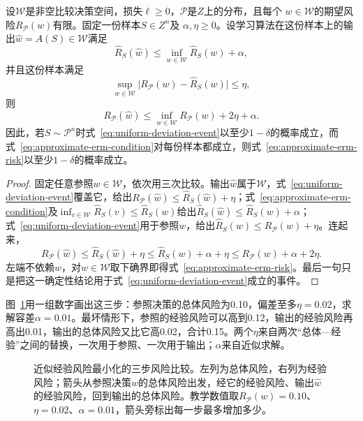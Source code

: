 \begin{theorem}[近似经验风险最小化的风险比较]
\label{thm:approximate-erm-risk}
设$\mathcal W$是非空比较决策空间，损失$\ell\geq0$，$\mathcal P$是$Z$上的分布，且每个
$w\in\mathcal W$的期望风险$R_{\mathcal P}(w)$有限。固定一份样本$S\in Z^n$及
$\alpha,\eta\geq0$。设学习算法在这份样本上的输出$\hat w=A(S)\in\mathcal W$满足
\begin{equation}
 \hat R_S(\hat w)\leq\inf_{w\in\mathcal W}\hat R_S(w)+\alpha,
 \label{eq:approximate-erm-condition}
\end{equation}
并且这份样本满足
\begin{equation}
 \sup_{w\in\mathcal W}\bigl|R_{\mathcal P}(w)-\hat R_S(w)\bigr|\leq\eta,
 \label{eq:uniform-deviation-event}
\end{equation}
则
\begin{equation}
 R_{\mathcal P}(\hat w)
 \leq\inf_{w\in\mathcal W}R_{\mathcal P}(w)+2\eta+\alpha.
 \label{eq:approximate-erm-risk}
\end{equation}
因此，若$S\sim\mathcal P^n$时式~\eqref{eq:uniform-deviation-event}以至少$1-\delta$的概率成立，而式~\eqref{eq:approximate-erm-condition}对每份样本都成立，则式~\eqref{eq:approximate-erm-risk}以至少$1-\delta$的概率成立。
\end{theorem}

\begin{proof}
固定任意参照$w\in\mathcal W$，依次用三次比较。输出$\hat w$属于$\mathcal W$，式~\eqref{eq:uniform-deviation-event}覆盖它，给出$R_{\mathcal P}(\hat w)\leq\hat R_S(\hat w)+\eta$；式~\eqref{eq:approximate-erm-condition}及$\inf_{v\in\mathcal W}\hat R_S(v)\leq\hat R_S(w)$给出$\hat R_S(\hat w)\leq\hat R_S(w)+\alpha$；式~\eqref{eq:uniform-deviation-event}用于参照$w$，给出$\hat R_S(w)\leq R_{\mathcal P}(w)+\eta$。连起来，
\[
 R_{\mathcal P}(\hat w)
 \leq\hat R_S(\hat w)+\eta
 \leq\hat R_S(w)+\alpha+\eta
 \leq R_{\mathcal P}(w)+\alpha+2\eta.
\]
左端不依赖$w$，对$w\in\mathcal W$取下确界即得式~\eqref{eq:approximate-erm-risk}。最后一句只是把这一确定性结论用于式~\eqref{eq:uniform-deviation-event}成立的事件。
\end{proof}

图~\ref{fig:lt4-risk-comparison-chain}用一组数字画出这三步：参照决策的总体风险为0.10，偏差至多$\eta=0.02$，求解容差$\alpha=0.01$。最坏情形下，参照的经验风险可以高到0.12，输出的经验风险再高出0.01，输出的总体风险又比它高0.02，合计0.15。两个$\eta$来自两次“总体—经验”之间的替换，一次用于参照、一次用于输出；$\alpha$来自近似求解。

\begin{figure}[htbp]
 \centering
 
 \caption{近似经验风险最小化的三步风险比较。左列为总体风险，右列为经验风险；箭头从参照决策$w$的总体风险出发，经它的经验风险、输出$\hat w$的经验风险，回到输出的总体风险。教学数值取$R_{\mathcal P}(w)=0.10$、$\eta=0.02$、$\alpha=0.01$，箭头旁标出每一步最多增加多少。}
 \label{fig:lt4-risk-comparison-chain}
\end{figure}

